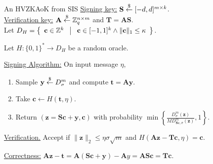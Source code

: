 \begin{frame}{An HVZKAoK from SIS}
	\underline{Signing key:} $\mathbf{S} \stackrel{\$}{\leftarrow} [-d, d]^{m\times k}$.\\
	
	\underline{Verification key:} $\mathbf{A} \stackrel{\$}{\leftarrow} \mathbb{Z}_q^{n \times m}$ and $\mathbf{T} = \mathbf{A}\mathbf{S}$.\\
	
	Let $D_H = \left\{ \begin{array}{c} \mathbf{c} \in \mathbb{Z}^k \end{array}\;\middle|\;\begin{array}{c} \mathbf{c} \in [-1, 1]^k \wedge \lVert\mathbf{c}\rVert_1 \leq \kappa \end{array} \right\}$.
	
	Let $H:\{0,1\}^*\to D_H$ be a random oracle.
	
	\underline{Signing Algorithm:} On input message $\eta$,
	\begin{enumerate}
		\item Sample $\mathbf{y} \stackrel{\$}{\leftarrow} D^m_\sigma$ and compute $\mathbf{t} = \mathbf{A}\mathbf{y}$.
		\item Take $\mathbf{c} \leftarrow H(\mathbf{t}, \eta)$.
		\item Return $(\mathbf{z} = \mathbf{S}\mathbf{c} + \mathbf{y}, \mathbf{c})$ with probability $\min\left\{\frac{D^m_\sigma(\mathbf{z})}{MD^m_{\mathbf{S}\mathbf{c},\sigma}(\mathbf{z})},1\right\}$.
	\end{enumerate}

	\underline{Verification.} Accept if $\lVert\mathbf{z}\rVert_2 \leq \eta\sigma\sqrt{m}$ and $H(\mathbf{A}\mathbf{z}- \mathbf{T}\mathbf{c}, \eta) = \mathbf{c}$.

	\underline{Correctness:} $\mathbf{A}\mathbf{z} - \mathbf{t} = \mathbf{A}(\mathbf{S}\mathbf{c}+\mathbf{y}) - \mathbf{A}{y} = \mathbf{A}\mathbf{S}\mathbf{c} = \mathbf{T}\mathbf{c}$.
\end{frame}

